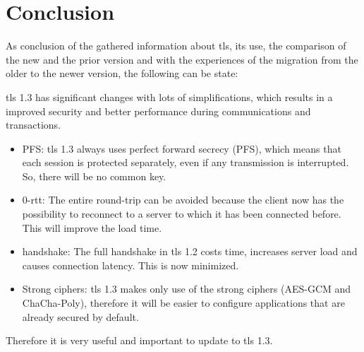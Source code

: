 \chapter{Conclusion}
\label{chap:conclusion}

As conclusion of the gathered information about \gls{tls}, its use, the comparison of the new and the prior version and with the experiences of the migration from the older to the newer version, the following can be state:

\gls{tls} 1.3 has significant changes with lots of simplifications, which results in a improved security and better performance during communications and transactions. 
\begin{itemize}
   \item PFS: \gls{tls} 1.3 always uses perfect forward secrecy (PFS), which means that each session is protected separately, even if any transmission is interrupted. So, there will be no common key. 

   \item 0-\gls{rtt}: The entire round-trip can be avoided because the client now has the possibility to reconnect to a server to which it has been connected before. This will improve the load time.

   \item handshake: The full handshake in \gls{tls} 1.2 costs time, increases server load and causes connection latency. This is now minimized.

   \item  Strong ciphers: \gls{tls} 1.3 makes only use of the strong ciphers (AES-GCM and ChaCha-Poly), therefore it will be easier to configure applications that are already secured by default.
\end{itemize}
Therefore it is very useful and important to update to \gls{tls} 1.3.


